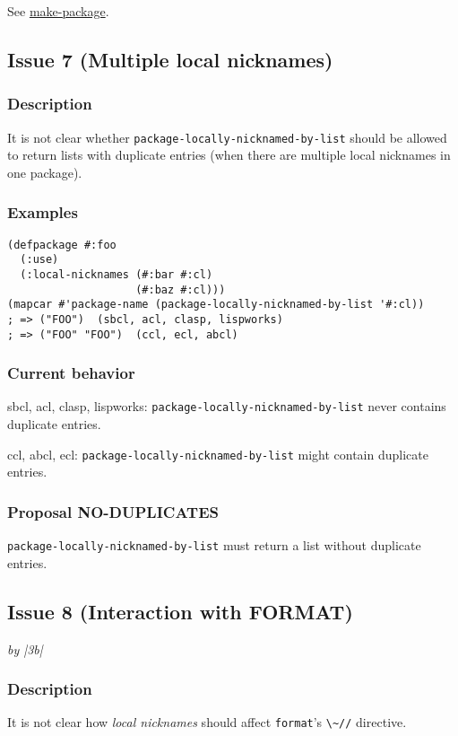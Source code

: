 \documentclass[11pt]{article}
\begin{document}
See \hyperref[sec:org1fd55bd]{make-package}.

\subsection{Issue 7 (Multiple local nicknames)}
\label{sec:org33fe300}
\subsubsection{Description}
\label{sec:org8a6ba3f}
It is not clear whether \texttt{package-locally-nicknamed-by-list} should be allowed to return
lists with duplicate entries (when there are multiple local nicknames in one package).
\subsubsection{Examples}
\label{sec:org7016090}
\begin{verbatim}
(defpackage #:foo
  (:use)
  (:local-nicknames (#:bar #:cl)
                    (#:baz #:cl)))
(mapcar #'package-name (package-locally-nicknamed-by-list '#:cl))
; => ("FOO")  (sbcl, acl, clasp, lispworks)
; => ("FOO" "FOO")  (ccl, ecl, abcl)
\end{verbatim}
\subsubsection{Current behavior}
\label{sec:org0d0ba72}
sbcl, acl, clasp, lispworks:
  \texttt{package-locally-nicknamed-by-list} never contains duplicate entries.

ccl, abcl, ecl:
  \texttt{package-locally-nicknamed-by-list} might contain duplicate entries.
\subsubsection{Proposal NO-DUPLICATES}
\label{sec:org38cc840}
\texttt{package-locally-nicknamed-by-list} must return a list without duplicate entries.

\subsection{Issue 8 (Interaction with FORMAT)}
\label{sec:orgbc62926}
\emph{by |3b|}
\subsubsection{Description}
\label{sec:org528717b}
It is not clear how \emph{local nicknames} should affect \texttt{format}'s \texttt{\textbackslash{}\textasciitilde{}//} directive.
\end{document}
